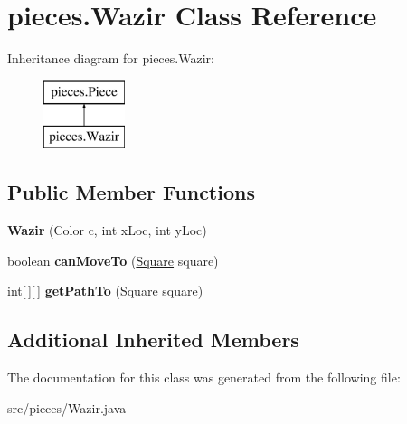 \hypertarget{classpieces_1_1_wazir}{\section{pieces.\-Wazir Class Reference}
\label{classpieces_1_1_wazir}
}
Inheritance diagram for pieces.\-Wazir\-:\begin{figure}[H]
\begin{center}
\leavevmode
\includegraphics[height=2.000000cm]{classpieces_1_1_wazir}
\end{center}
\end{figure}
\subsection*{Public Member Functions}
\begin{DoxyCompactItemize}
\item 
\hypertarget{classpieces_1_1_wazir_a69018ccd9e05deef3f28ed5549b0bced}{{\bfseries Wazir} (Color c, int x\-Loc, int y\-Loc)}\label{classpieces_1_1_wazir_a69018ccd9e05deef3f28ed5549b0bced}

\item 
\hypertarget{classpieces_1_1_wazir_a89e055407799273ecd95f46983573663}{boolean {\bfseries can\-Move\-To} (\hyperlink{classboard_1_1_square}{Square} square)}\label{classpieces_1_1_wazir_a89e055407799273ecd95f46983573663}

\item 
\hypertarget{classpieces_1_1_wazir_a7591bea4941b3cddbcd5d5f3e94234b8}{int\mbox{[}$\,$\mbox{]}\mbox{[}$\,$\mbox{]} {\bfseries get\-Path\-To} (\hyperlink{classboard_1_1_square}{Square} square)}\label{classpieces_1_1_wazir_a7591bea4941b3cddbcd5d5f3e94234b8}

\end{DoxyCompactItemize}
\subsection*{Additional Inherited Members}


The documentation for this class was generated from the following file\-:\begin{DoxyCompactItemize}
\item 
src/pieces/Wazir.\-java\end{DoxyCompactItemize}
